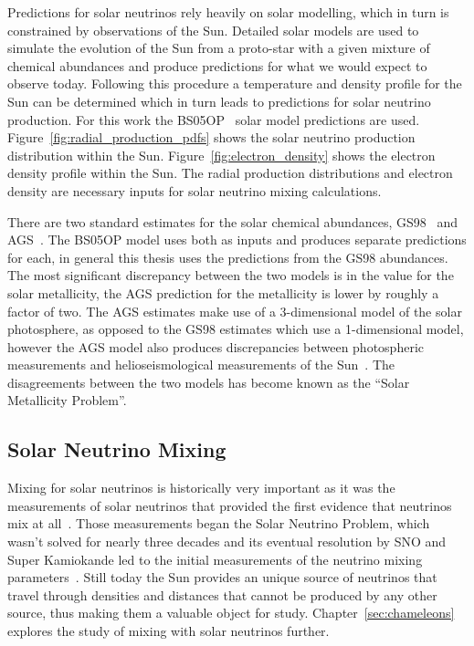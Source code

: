 Predictions for solar neutrinos rely heavily on solar modelling, which in turn
is constrained by observations of the Sun.
Detailed solar models are used to simulate the evolution of the Sun from a proto-star
with a given mixture of chemical abundances and produce predictions for
what we would expect to observe today.
Following this procedure a temperature and density profile for the Sun can be determined
which in turn leads to predictions for solar neutrino production.
For this work the BS05OP~\cite{bs_ssm} solar model predictions are used.
Figure~\ref{fig:radial_production_pdfs} shows the solar neutrino production
distribution within the Sun.
Figure~\ref{fig:electron_density} shows the electron density profile within
the Sun.
The radial production distributions and electron density are necessary inputs
for solar neutrino mixing calculations.

There are two standard estimates for the solar chemical abundances,
GS98~\cite{gs98} and AGS~\cite{ags}.
The BS05OP model uses both as inputs and produces separate predictions for each,
in general this thesis uses the predictions from the GS98 abundances.
The most significant discrepancy between the two models is in the value
for the solar metallicity, the AGS prediction for the metallicity is
lower by roughly a factor of two.
The AGS estimates make use of a 3-dimensional model of the solar photosphere,
as opposed to the GS98 estimates which use a 1-dimensional model, however
the AGS model also produces discrepancies between photospheric measurements
and helioseismological measurements of the Sun~\cite{ags, bahcall01}.
The disagreements between the two models has become known as the
``Solar Metallicity Problem''.

\subsection{Solar Neutrino Mixing}
Mixing for solar neutrinos is historically very important as it was
the measurements of solar neutrinos that provided the first evidence that
neutrinos mix at all~\cite{homestake,solar_nu_problem}.
Those measurements began the Solar Neutrino Problem, which wasn't solved
for nearly three decades and its eventual resolution by SNO and Super Kamiokande
led to the initial measurements of the neutrino mixing parameters~\cite{superk_atmospherics,
sno_second}.
Still today the Sun provides an unique source of neutrinos that travel through
densities and distances that cannot be produced by any other source, thus making
them a valuable object for study.
Chapter~\ref{sec:chameleons} explores the study of mixing with
solar neutrinos further.

